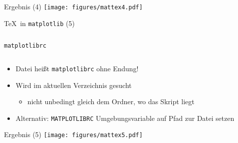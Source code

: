 \AddToShipoutPictureFG*{\ShowFramePicture}
\begin{frame}{Ergebnis (4)}
  \centering
  \texttt{[image: figures/mattex4.pdf]}
\end{frame}

\begin{frame}[fragile]{\TeX\ in \texttt{matplotlib} (5)}
  \inputminted{python}{script/mattex5.py}
\end{frame}

\begin{frame}[fragile]{\texttt{matplotlibrc}}
  \inputminted{text}{script/matplotlibrc}

  \begin{itemize}
    \item Datei heißt \texttt{matplotlibrc} ohne Endung!
    \item Wird im aktuellen Verzeichnis gesucht
      \begin{itemize}
        \item nicht unbedingt gleich dem Ordner, wo das Skript liegt
      \end{itemize}
    \item Alternativ: \texttt{MATPLOTLIBRC} Umgebungsvariable auf Pfad zur Datei setzen
  \end{itemize}
\end{frame}

\AddToShipoutPictureFG*{\ShowFramePicture}
\begin{frame}{Ergebnis (5)}
  \centering
  \texttt{[image: figures/mattex5.pdf]}
\end{frame}
